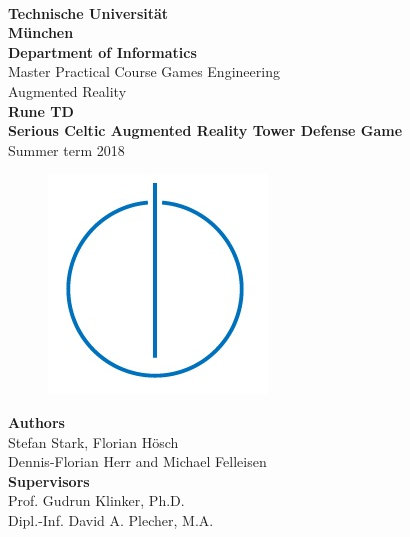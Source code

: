 
\begin{center}
	\bigskip \bigskip
	\oTUM{6.0cm} \\
	\vspace*{0.8cm}
	{\huge \bf Technische Universität} \\
	\bigskip
	{\huge \bf München} \\
	\bigskip \bigskip
	{\huge \bf Department of Informatics} \\
	\bigskip
	{\Large Master Practical Course Games Engineering } \\     
	\vspace*{0.2cm}
	{\Large  Augmented Reality} \\        
	\bigskip \bigskip
	{\Large \bf Rune TD}\\
	\vspace*{0.2cm}
	{\large \bf Serious Celtic Augmented Reality Tower Defense Game} \\
	\bigskip
	\bigskip
	{\Large Summer term 2018} \\        
	\bigskip
	\begin{figure}[ht]
		\centering \includegraphics[width=0.15\linewidth]{figures/infologo.jpg}
	\end{figure}
	\bigskip
	{\Large \bf Authors} \\
	\vspace*{0.5cm}
	{\Large Stefan Stark, Florian Hösch}	\\
	\vspace*{0.5cm}
	{\Large Dennis-Florian Herr and Michael Felleisen}\\
	\vspace*{1cm}
	{\Large \bf Supervisors} \\
	\vspace*{0.5cm}
	{\Large Prof. Gudrun Klinker, Ph.D.}\\
	\vspace*{0.5cm}
	{\Large Dipl.-Inf. David A. Plecher, M.A.}\\
\end{center}

\vspace*{0.5cm}
